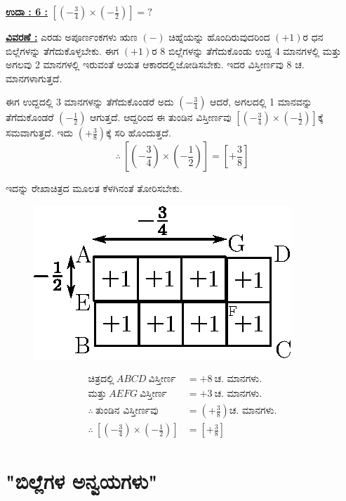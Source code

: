\noindent
{\textbf{\underline{ಉದಾ : 6 :}}} $\left[\left(-\frac{3}{4}\right) \times \left(-\frac{1}{2}\right) \right] = ?$

\noindent
{\textbf{\underline{ವಿವರಣೆ :}}} ಎರಡು ಅಪೂರ್ಣಂಕಗಳು ಋಣ $(-)$ ಚಿಹ್ನೆಯನ್ನು ಹೊಂದಿರುವುದರಿಂದ $(+1)$ರ ಧನ ಬಿಲ್ಲೆಗಳನ್ನು ತೆಗೆದುಕೊಳ್ಳಬೇಕು. ಈಗ $(+1)$ರ 8 ಬಿಲ್ಲೆಗಳನ್ನು ತೆಗೆದು\-ಕೊಂಡು ಉದ್ದ 4 ಮಾನಗಳಲ್ಲಿ ಮತ್ತು ಅಗಲವು 2 ಮಾನಗಳಲ್ಲಿ ಇರುವಂತೆ ಆಯತ ಆಕಾರದಲ್ಲಿ\break  ಜೋಡಿಸಬೇಕು. ಇದರ ವಿಸ್ತೀರ್ಣವು 8 ಚ. ಮಾನಗಳಾಗುತ್ತದೆ. 

ಈಗ ಉದ್ದದಲ್ಲಿ 3 ಮಾನಗಳನ್ನು ತೆಗೆದುಕೊಂಡರೆ ಅದು $\left(-\frac{3}{4}\right)$ ಆದರೆ, ಅಗಲದಲ್ಲಿ 1 ಮಾನವನ್ನು ತೆಗೆದುಕೊಂಡರೆ $\left(-\frac{1}{2} \right)$ ಆಗುತ್ತದೆ. ಆದ್ದರಿಂದ ಈ ತುಂಡಿನ ವಿಸ್ತೀರ್ಣವು $\left[\left(-\frac{3}{4}\right) \times \left(-\frac{1}{2}\right) \right]$ಕ್ಕೆ ಸಮವಾಗುತ್ತದೆ. ಇದು $\left(+\frac{3}{8}\right)$ಕ್ಕೆ ಸರಿ ಹೊಂದುತ್ತದೆ. 
$$
\therefore~ \left[\left(-\frac{3}{4}\right) \times \left(-\frac{1}{2}\right) \right] = \left[+ \frac{3}{8} \right]
$$

ಇದನ್ನು ರೇಖಾಚಿತ್ರದ ಮೂಲತ ಕೆಳಗಿನಂತೆ ತೋರಿಸಬೇಕು. 
\begin{figure}[H]
\centering
\includegraphics[scale=0.8]{src/figure/chap3/fig3-28b.eps}
\end{figure}
\begin{align*}
\text{ಚಿತ್ರದಲ್ಲಿ}~ ABCD ~\text{ವಿಸ್ತೀರ್ಣ} & = +8~ \text{ಚ. ಮಾನಗಳು.}\\
\text{ಮತ್ತು}~ AEFG ~\text{ವಿಸ್ತೀರ್ಣ} & = +3~ \text{ಚ. ಮಾನಗಳು.}\\
\therefore~ \text{ತುಂಡಿನ ವಿಸ್ತೀರ್ಣವು} & = \left(+\frac{3}{8} \right) \text{ಚ. ಮಾನಗಳು.}\\
\therefore~ \left[\left(-\frac{3}{4}\right) \times \left(-\frac{1}{2}\right) \right] & = \left[+\frac{3}{8}\right]
\end{align*}

\section*{"ಬಿಲ್ಲೆಗಳ ಅನ್ವಯಗಳು"}

